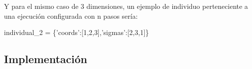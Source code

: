 \documentclass[11pt]{article}
\newenvironment{Shaded}{}{}
\newcommand{\DecValTok}[1]{\textcolor[rgb]{0.25,0.63,0.44}{{#1}}}
\newcommand{\StringTok}[1]{\textcolor[rgb]{0.25,0.44,0.63}{{#1}}}
\newcommand{\NormalTok}[1]{{#1}}
\newcommand{\OperatorTok}[1]{\textcolor[rgb]{0.40,0.40,0.40}{{#1}}}
\begin{document}
Y para el mismo caso de 3 dimensiones, un ejemplo de individuo
perteneciente a una ejecución configurada con n pasos sería:

\begin{Shaded}
\begin{Highlighting}[]
\NormalTok{individual_2 }\OperatorTok{=} \NormalTok{\{}\StringTok{'coords'}\NormalTok{:[}\DecValTok{1}\NormalTok{,}\DecValTok{2}\NormalTok{,}\DecValTok{3}\NormalTok{],}\StringTok{'sigmas'}\NormalTok{:[}\DecValTok{2}\NormalTok{,}\DecValTok{3}\NormalTok{,}\DecValTok{1}\NormalTok{]\}}
\end{Highlighting}
\end{Shaded}

\subsection{Implementación}\label{implementaciuxf3n}
\end{document}
